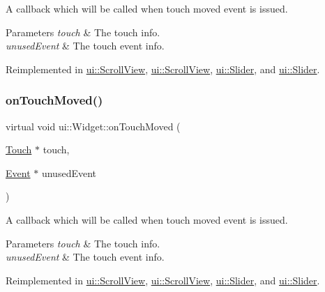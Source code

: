 A callback which will be called when touch moved event is issued. 
\begin{DoxyParams}{Parameters}
{\em touch} & The touch info. \\
\hline
{\em unused\+Event} & The touch event info. \\
\hline
\end{DoxyParams}


Reimplemented in \hyperlink{classui_1_1ScrollView_a14d0d7bcb1061ba38fa9b0d2d1715b1c}{ui\+::\+Scroll\+View}, \hyperlink{classui_1_1ScrollView_aabab84777e16b8c5d90cd8d045e45471}{ui\+::\+Scroll\+View}, \hyperlink{classui_1_1Slider_a4641ca08091646358a0e325b5dcd8fb5}{ui\+::\+Slider}, and \hyperlink{classui_1_1Slider_abc18db1077436cc39bebc3e9c245a8a7}{ui\+::\+Slider}.

\mbox{\label{classui_1_1Widget_a4db5ae7799818d9150316e152191d95d}} 
\subsubsection{\texorpdfstring{on\+Touch\+Moved()}{onTouchMoved()}\hspace{0.1cm}{\footnotesize\ttfamily [2/2]}}
{\footnotesize\ttfamily virtual void ui\+::\+Widget\+::on\+Touch\+Moved (\begin{DoxyParamCaption}\item[{\hyperlink{classTouch}{Touch} $\ast$}]{touch,  }\item[{\hyperlink{classEvent}{Event} $\ast$}]{unused\+Event }\end{DoxyParamCaption})\hspace{0.3cm}{\ttfamily [virtual]}}

A callback which will be called when touch moved event is issued. 
\begin{DoxyParams}{Parameters}
{\em touch} & The touch info. \\
\hline
{\em unused\+Event} & The touch event info. \\
\hline
\end{DoxyParams}


Reimplemented in \hyperlink{classui_1_1ScrollView_a14d0d7bcb1061ba38fa9b0d2d1715b1c}{ui\+::\+Scroll\+View}, \hyperlink{classui_1_1ScrollView_aabab84777e16b8c5d90cd8d045e45471}{ui\+::\+Scroll\+View}, \hyperlink{classui_1_1Slider_a4641ca08091646358a0e325b5dcd8fb5}{ui\+::\+Slider}, and \hyperlink{classui_1_1Slider_abc18db1077436cc39bebc3e9c245a8a7}{ui\+::\+Slider}.

